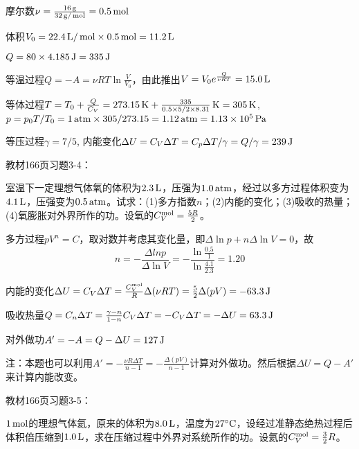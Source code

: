 \documentclass[CJK]{beamer}
\begin{document}
\begin{frame}
  \bch
  摩尔数$\nu = \frac{16\,\mathrm{g}}{32\,\mathrm{g}/\,\mathrm{mol}} = 0.5\,\mathrm{mol}$
  
  体积$V_0 = 22.4\,\mathrm{L}/\,\mathrm{mol} \times 0.5\,\mathrm{mol} = 11.2\,\mathrm{L}$

  $Q = 80\times 4.185 \,\mathrm{J} = 335\,\mathrm{J}$
  \bitem
\item{等温过程$Q = -A = \nu RT \ln\frac{V}{V_0}$，由此推出$V = V_0e^{\frac{Q}{\nu RT}} = 15.0\,\mathrm{L}$}
\item{等体过程$T = T_0+ \frac{Q}{C_V} = 273.15\,\mathrm{K} + \frac{335}{0.5\times 5/2\times 8.31}\,\mathrm{K} = 305\,\mathrm{K}$, $p = p_0 T/T_0 = 1\,\mathrm{atm} \times 305/273.15 = 1.12 \,\mathrm{atm} = 1.13\times 10^5\,\mathrm{Pa}$}
\item{等压过程$\gamma = 7/5$, 内能变化$\Delta U = C_V\Delta T = C_p\Delta T /\gamma = Q/\gamma = 239\,\mathrm{J}$}
  \eitem
  
  \ech
\end{frame}

\begin{frame}
  \chtitle{\proid (\stwo)}
  \bch
  教材166页习题3-4：

  室温下一定理想气体氧的体积为$2.3\,\mathrm{L}$，压强为$1.0\,\mathrm{atm}$，经过以多方过程体积变为$4.1\,\mathrm{L}$，压强变为$0.5\,\mathrm{atm}$。试求：(1)多方指数$n$；(2)内能的变化；(3)吸收的热量；(4)氧膨胀对外界所作的功。设氧的$C_V^{\rm mol}=\frac{5R}{2}$。
  \ech
\end{frame}

\begin{frame}
  \bch
      {\small
        \bitem
      \item{
        多方过程$pV^n = C$，取对数并考虑其变化量，即$\Delta \ln p + n \Delta \ln V = 0$，故
        $$n = - \frac{\Delta ln p}{\Delta \ln V} = -\frac{\ln\frac{0.5}{1}}{\ln\frac{4.1}{2.3}} = 1.20 $$}
      \item{内能的变化$\Delta U  = C_V\Delta T = \frac{C_V^{\rm mol}}{R}\Delta (\nu RT) = \frac{5}{2}\Delta(pV) = -63.3\,\mathrm{J}$}
      \item{吸收热量$Q = C_n \Delta T = \frac{\gamma-n}{1-n}C_V\Delta T = -C_V\Delta T = -\Delta U = 63.3\,\mathrm{J}$}
      \item{对外做功$A'=-A = Q-\Delta U = 127\,\mathrm{J}$}
        \eitem
        \skipline
        
注：本题也可以利用$A' = -\frac{\nu R \Delta T}{n-1} =-\frac{\Delta(pV)}{n-1}$计算对外做功。然后根据$\Delta U = Q-A'$来计算内能改变。        
  }
  \ech
\end{frame}

\begin{frame}
  \chtitle{\proid (\sone)}
  \bch
  教材166页习题3-5：

  $1\,\mathrm{mol}$的理想气体氦，原来的体积为$8.0\,\mathrm{L}$，温度为$27^\circ \mathrm{C}$，设经过准静态绝热过程后体积倍压缩到$1.0\,\mathrm{L}$，求在压缩过程中外界对系统所作的功。设氦的$C_V^{\rm mol} = \frac{3}{2}R$。
  \ech
\end{frame}
\end{document}
